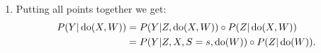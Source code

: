 {\begin{enumerate}
         The 1st rule of do-calculus then shows the equation:
         \begin{align*}
             P(Y|Z,X,\doit(W)) & = P(Y|Z,X,S,\doit(W)).
         \end{align*}
         Since the left hand side is not dependent on $S$ we can evaluate at $S=s$ and get:
         \begin{align*}
             P(Y|Z,X,\doit(W)) & = P(Y|Z,X,S=s,\doit(W)).
         \end{align*}
     \item Putting all points together we get:
        \begin{align*}
            P(Y|\operatorname{do}(X,W)) &= P(Y|Z,\operatorname{do}(X,W)) \circ P(Z|\operatorname{do}(X,W)) \\
                            &= P(Y|Z,X,S=s,\operatorname{do}(W)) \circ P(Z|\operatorname{do}(W)).
        \end{align*}
\end{enumerate}
}
